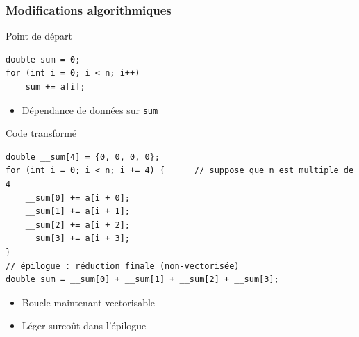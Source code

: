\documentclass[xcolor={x11names,svgnames}]{beamer}
\begin{document}
\begin{frame}[fragile=singleslide]
  \frametitle{Modifications algorithmiques}

  \begin{block}{Point de départ}

\begin{verbatim}
double sum = 0;
for (int i = 0; i < n; i++)
    sum += a[i];
\end{verbatim}

    \begin{itemize}
    \item Dépendance de données sur \texttt{sum}
    \end{itemize}
  \end{block}

  \begin{exampleblock}{Code transformé}

\begin{verbatim}
double __sum[4] = {0, 0, 0, 0};
for (int i = 0; i < n; i += 4) {      // suppose que n est multiple de 4
    __sum[0] += a[i + 0];
    __sum[1] += a[i + 1];
    __sum[2] += a[i + 2];
    __sum[3] += a[i + 3];
}
// épilogue : réduction finale (non-vectorisée)
double sum = __sum[0] + __sum[1] + __sum[2] + __sum[3];
\end{verbatim}

    \begin{itemize}
    \item Boucle maintenant vectorisable
    \item Léger surcoût dans l'épilogue
    \end{itemize}
  \end{exampleblock}
\end{frame}

\end{document}
